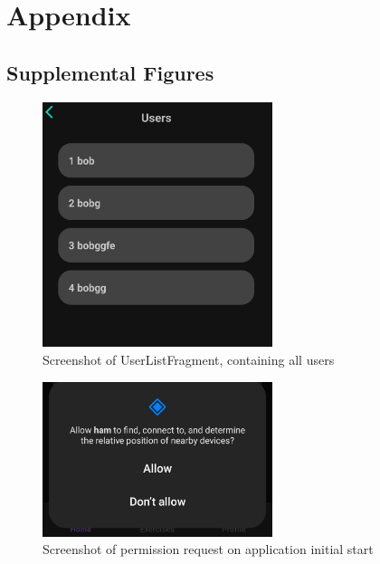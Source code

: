 \appendix


\chapter{Appendix}

\section{Supplemental Figures}
\begin{figure}[H]
    \centering
    \includegraphics[width=0.6\textwidth]{images/userlistfragment-screenshot.jpeg}
    \caption{Screenshot of UserListFragment, containing all users}
    \label{fig:userlistfragment}
\end{figure}

\begin{figure}[H]
    \centering
    \includegraphics[width=0.6\textwidth]{images/permission-request.jpeg}
    \caption{Screenshot of permission request on application initial start}
    \label{fig:req_permission}
\end{figure}